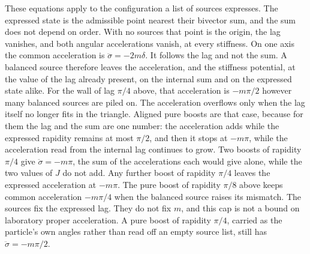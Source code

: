 \documentclass[a4paper]{article}
\begin{document}
These equations apply to the configuration a list of sources expresses. The expressed state is the admissible point nearest their bivector sum, and the sum does not depend on order. With no sources that point is the origin, the lag vanishes, and both angular accelerations vanish, at every stiffness. On one axis the common acceleration is $\ddot\sigma=-2m\delta$. It follows the lag and not the sum. A balanced source therefore leaves the acceleration, and the stiffness potential, at the value of the lag already present, on the internal sum and on the expressed state alike. For the wall of lag $\pi/4$ above, that acceleration is $-m\pi/2$ however many balanced sources are piled on. The acceleration overflows only when the lag itself no longer fits in the triangle. Aligned pure boosts are that case, because for them the lag and the sum are one number: the acceleration adds while the expressed rapidity remains at most $\pi/2$, and then it stops at $-m\pi$, while the acceleration read from the internal lag continues to grow. Two boosts of rapidity $\pi/4$ give $\ddot\sigma=-m\pi$, the sum of the accelerations each would give alone, while the two values of $J$ do not add. Any further boost of rapidity $\pi/4$ leaves the expressed acceleration at $-m\pi$. The pure boost of rapidity $\pi/8$ above keeps common acceleration $-m\pi/4$ when the balanced source raises its mismatch. The sources fix the expressed lag. They do not fix $m$, and this cap is not a bound on laboratory proper acceleration. A pure boost of rapidity $\pi/4$, carried as the particle's own angles rather than read off an empty source list, still has $\ddot\sigma=-m\pi/2$.
\end{document}
